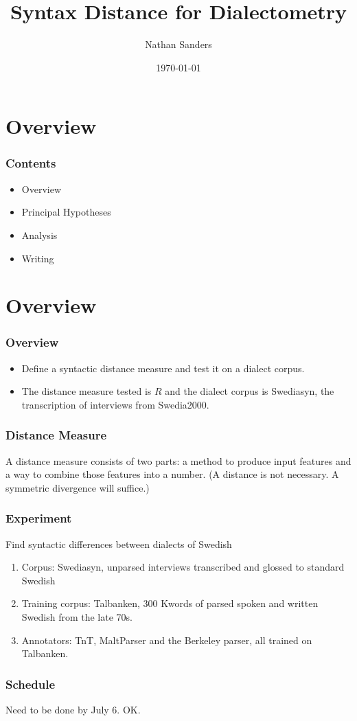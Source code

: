 \documentclass{beamer}
\title{Syntax Distance for Dialectometry}
\author{Nathan Sanders}
\date{\today}
\begin{document}
\frame{\titlepage}
\section{Overview}
\begin{frame}
  \frametitle{Contents}
  \begin{itemize}
  \item Overview
  \item Principal Hypotheses
  \item Analysis
  \item Writing
\end{itemize}
\end{frame}

\section{Overview}
\begin{frame}
  \frametitle{Overview}
  \begin{itemize}
 \item Define a syntactic distance measure and test it on a dialect corpus.
 \item The distance measure tested is $R$ and the dialect corpus is
  Swediasyn, the transcription of interviews from Swedia2000.
  \end{itemize}

\end{frame}
\begin{frame}
  \frametitle{Distance Measure}
  A distance measure consists of two parts: a method to produce input
  features and a way to combine those features into a number. (A distance
  is not necessary. A symmetric divergence will suffice.)
\end{frame}
\begin{frame}
  \frametitle{Experiment}
  Find syntactic differences between dialects of Swedish
  \begin{enumerate}
  \item Corpus: Swediasyn, unparsed interviews transcribed and glossed
    to standard Swedish
  \item Training corpus: Talbanken, 300 Kwords of parsed spoken and
    written Swedish from the late 70s.
  \item Annotators: TnT, MaltParser and the Berkeley parser, all
    trained on Talbanken.
  \end{enumerate}
\end{frame}
\begin{frame}
  \frametitle{Schedule}
  Need to be done by July 6. OK.
\end{frame}
\end{document}
